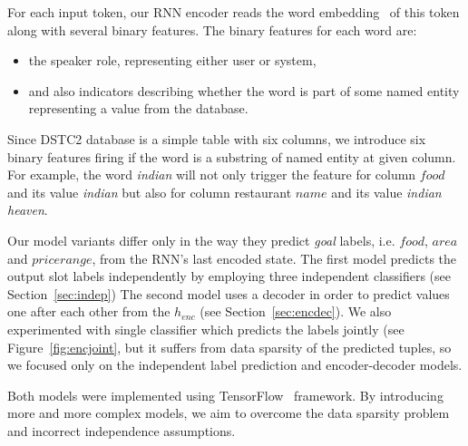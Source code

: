 \documentclass{itatnew}
\begin{document}
For each input token, our RNN encoder reads the word embedding~\cite{bengio2003neural} of this token along with several binary features. 
The binary features for each word are:
\begin{itemize}
	\item the speaker role, representing either user or system,
    \item and also indicators describing whether the word is part of some named entity representing a value from the database.
\end{itemize}
  
Since DSTC2 database is a simple table with six columns, we introduce six binary features firing if the word is a substring of named entity at given column.
For example, the word {\it indian} will not only trigger the feature for column $food$ and its value {\it indian} but also for column restaurant $name$ and its value {\it indian heaven}.

Our model variants differ only in the way they predict {\it goal} labels, i.e. $food$, $area$ and $price range$, from the RNN's last encoded state.
The first model predicts the output slot labels independently by employing three independent classifiers (see Section~\ref{sec:indep})
The second model uses a decoder in order to predict values one after each other from the $h_{enc}$ (see Section~\ref{sec:encdec}).
We also experimented with single classifier which predicts the labels jointly (see Figure~\ref{fig:encjoint}, but it suffers from data sparsity of the predicted tuples, so we focused only on the independent label prediction and encoder-decoder models.

Both models were implemented using TensorFlow~\cite{abaditensorflow} framework. By introducing more and more complex models, we aim to overcome the data sparsity problem and incorrect independence assumptions.
\end{document}
